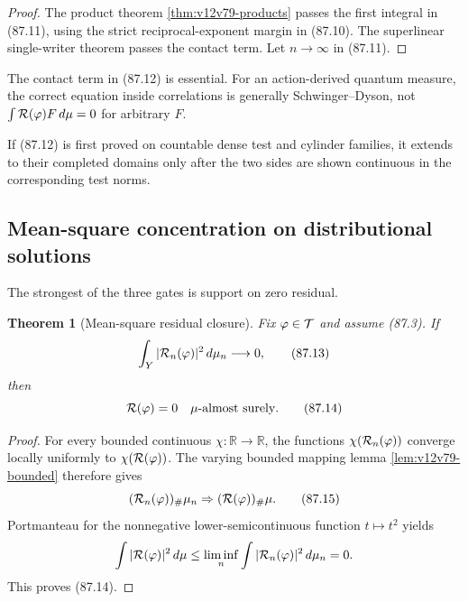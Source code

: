 \documentclass[11pt]{article}
\newtheorem{theorem}{Theorem}[section]
\theoremstyle{remark}
\begin{document}
\begin{proof}
The product theorem \ref{thm:v12v79-products} passes the first
integral in (87.11), using the strict reciprocal-exponent margin in
(87.10).  The superlinear single-writer theorem passes the contact
term.  Let \(n\to\infty\) in (87.11).
\end{proof}

The contact term in (87.12) is essential.  For an action-derived
quantum measure, the correct equation inside correlations is
generally Schwinger--Dyson, not
\(\int{\cal R}(\varphi)F\,d\mu=0\) for arbitrary \(F\).

If (87.12) is first proved on countable dense test and cylinder
families, it extends to their completed domains only after the two
sides are shown continuous in the corresponding test norms.

\subsection{Mean-square concentration on distributional solutions}

The strongest of the three gates is support on zero residual.

\begin{theorem}[Mean-square residual closure]
\label{thm:v12v87-L2}
Fix \(\varphi\in{\cal T}\) and assume (87.3).  If
\begin{equation}
                         \int_Y
 |{\cal R}_n(\varphi)|^2\,d\mu_n
 \longrightarrow0,                                         \tag{87.13}
\end{equation}
then
\begin{equation}
                         {\cal R}(\varphi)=0
                         \quad\mu\text{-almost surely}.      \tag{87.14}
\end{equation}
\end{theorem}

\begin{proof}
For every bounded continuous
\(\chi:\mathbb R\to\mathbb R\), the functions
\(\chi({\cal R}_n(\varphi))\) converge locally uniformly to
\(\chi({\cal R}(\varphi))\).  The varying bounded mapping lemma
\ref{lem:v12v79-bounded} therefore gives
\[
 ({\cal R}_n(\varphi))_\#\mu_n
 \Rightarrow
 ({\cal R}(\varphi))_\#\mu.                                 \tag{87.15}
\]
Portmanteau for the nonnegative lower-semicontinuous function
\(t\mapsto t^2\) yields
\[
 \int|{\cal R}(\varphi)|^2\,d\mu
 \leq\liminf_n\int|{\cal R}_n(\varphi)|^2\,d\mu_n=0.
\]
This proves (87.14).
\end{proof}
\end{document}
